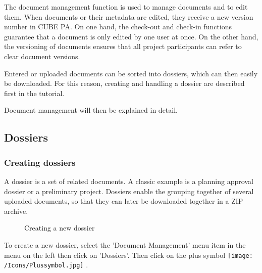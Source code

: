 \vspace{\baselineskip}

The document management function is used to manage documents and to edit them. When documents or their metadata are edited, they receive a new version number in CUBE PA. On one hand, the check-out and check-in functions guarantee that a document is only edited by one user at once. On the other hand, the versioning of documents ensures that all project participants can refer to clear document versions.

\vspace{1cm}  

Entered or uploaded documents can be sorted into dossiers, which can then easily be downloaded. For this reason, creating and handling a dossier are described first in the tutorial.

\vspace{\baselineskip}

Document management will then be explained in detail.

\subsection{Dossiers}
\label{bkm:Ref442544219}\subsubsection{Creating dossiers}

A dossier is a set of related documents. A classic example is a planning approval dossier or a preliminary project. Dossiers enable the grouping together of several uploaded documents, so that they can later be downloaded together in a ZIP archive.

\begin{figure}[H]
\caption{Creating a new dossier}
\end{figure}

To create a new dossier, select the 'Document Management' menu item in the menu on the left then click on 'Dossiers'. Then click on the plus symbol \texttt{[image: /Icons/Plussymbol.jpg]} .

